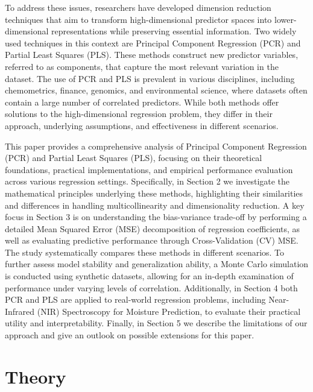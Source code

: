 \documentclass[11pt,twoside,a4paper]{article}
\begin{document}
To address these issues, researchers have developed dimension reduction techniques that aim to transform high-dimensional predictor spaces into lower-dimensional representations while preserving essential information. Two widely used techniques in this context are Principal Component Regression (PCR) and Partial Least Squares (PLS). These methods construct new predictor variables, referred to as components, that capture the most relevant variation in the dataset.
The use of PCR and PLS is prevalent in various disciplines, including chemometrics, finance, genomics, and environmental science, where datasets often contain a large number of correlated predictors. While both methods offer solutions to the high-dimensional regression problem, they differ in their approach, underlying assumptions, and effectiveness in different scenarios.

This paper provides a comprehensive analysis of  Principal Component Regression (PCR) and Partial Least Squares (PLS), focusing on their theoretical foundations, practical implementations, and empirical performance evaluation across various regression settings. Specifically, in Section 2 we investigate the mathematical principles underlying these methods, highlighting their similarities and differences in handling multicollinearity and dimensionality reduction. A key focus in Section 3 is on understanding the bias-variance trade-off by performing a detailed Mean Squared Error (MSE) decomposition of regression coefficients, as well as evaluating predictive performance through Cross-Validation (CV) MSE. The study systematically compares these methods in different scenarios. To further assess model stability and generalization ability, a Monte Carlo simulation is conducted using synthetic datasets, allowing for an in-depth examination of performance under varying levels of correlation. Additionally, in Section 4 both PCR and PLS are applied to real-world regression problems, including Near-Infrared (NIR) Spectroscopy for Moisture Prediction, to evaluate their practical utility and interpretability. Finally, in Section 5 we describe the limitations of our approach and give an outlook on possible extensions for this paper.
\newpage

\section{Theory}
\end{document}
